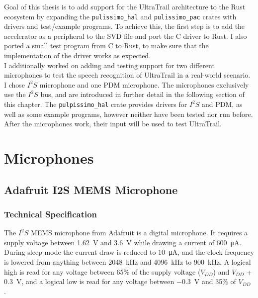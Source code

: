 

Goal of this thesis is to add support for the UltraTrail architecture to the Rust ecosystem by expanding the
\lstinline{pulissimo_hal} and \lstinline{pulissimo_pac} crates with drivers and test/example programs.
To achieve this, the first step is to add the accelerator as a peripheral to the SVD file and port the C driver to Rust.
I also ported a small test program from C to Rust, to make sure that the implementation of the driver works as expected.
\\
I additionally worked on adding and testing support for two different microphones to test
the speech recognition of UltraTrail in a real-world scenario.
I chose $I^2S$ microphone and one PDM microphone.
The microphones exclusively use the $I^2S$ bus, and are introduced in further detail in the following section of this chapter.
The \lstinline{pulpissimo_hal} crate provides drivers for $I^2S$ and PDM, as well as some example programs,
however neither have been tested nor run before.
After the microphones work, their input will be used to  test UltraTrail.


\section{Microphones}

\subsection{Adafruit I2S MEMS Microphone}

\subsubsection{Technical Specification}

The $I^2S$ MEMS microphone from Adafruit \cite{i2s_mic} is a digital microphone.
It requires a supply voltage between \SI{1.62}{\volt} and \SI{3.6}{\volt} while drawing a current of \SI{600}{\micro\ampere}.
During sleep mode the current draw is reduced to \SI{10}{\micro\ampere}, and the clock frequency is lowered from anything between
\SI{2048}{\kilo\hertz} and \SI{4096}{\kilo\hertz} to \SI{900}{\kilo\hertz}.
A logical high is read for any voltage between 65\% of the supply voltage ($V_{DD}$) and $V_{DD}$ + \SI{0.3}{\volt},
and a logical low is read for any voltage between \SI{-0.3}{\volt} and 35\% of $V_{DD}$ \cite{i2s_mic_datasheet}.

